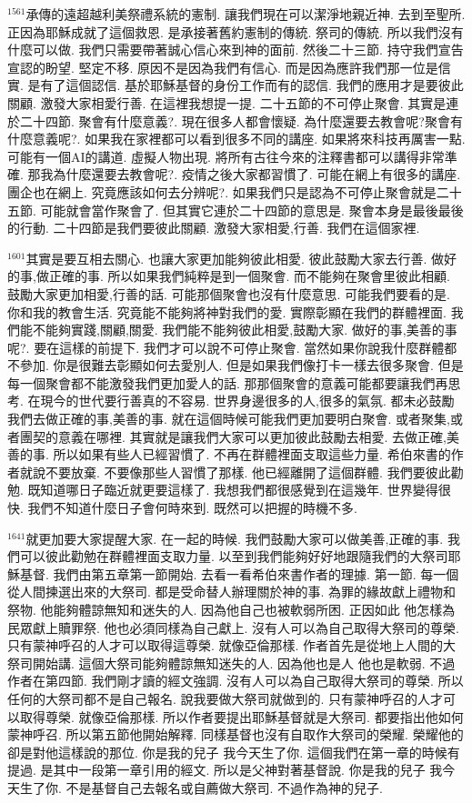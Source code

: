 \documentclass{book}
\begin{document}
$^{1561}$承傳的遠超越利美祭禮系統的憲制.
讓我們現在可以潔淨地親近神.
去到至聖所.
正因為耶穌成就了這個救恩.
是承接著舊約憲制的傳統.
祭司的傳統.
所以我們沒有什麼可以做.
我們只需要帶著誠心信心來到神的面前.
然後二十三節.
持守我們宣告宣認的盼望.
堅定不移.
原因不是因為我們有信心.
而是因為應許我們那一位是信實.
是有了這個認信.
基於耶穌基督的身份工作而有的認信.
我們的應用才是要彼此關顧.
激發大家相愛行善.
在這裡我想提一提.
二十五節的不可停止聚會.
其實是連於二十四節.
聚會有什麼意義?.
現在很多人都會懷疑.
為什麼還要去教會呢?聚會有什麼意義呢?.
如果我在家裡都可以看到很多不同的講座.
如果將來科技再厲害一點.
可能有一個AI的講道.
虛擬人物出現.
將所有古往今來的注釋書都可以講得非常準確.
那我為什麼還要去教會呢?.
疫情之後大家都習慣了.
可能在網上有很多的講座.
團企也在網上.
究竟應該如何去分辨呢?.
如果我們只是認為不可停止聚會就是二十五節.
可能就會當作聚會了.
但其實它連於二十四節的意思是.
聚會本身是最後最後的行動.
二十四節是我們要彼此關顧.
激發大家相愛,行善.
我們在這個家裡.

$^{1601}$其實是要互相去關心.
也讓大家更加能夠彼此相愛.
彼此鼓勵大家去行善.
做好的事,做正確的事.
所以如果我們純粹是到一個聚會.
而不能夠在聚會里彼此相顧.
鼓勵大家更加相愛,行善的話.
可能那個聚會也沒有什麼意思.
可能我們要看的是.
你和我的教會生活.
究竟能不能夠將神對我們的愛.
實際彰顯在我們的群體裡面.
我們能不能夠實踐,關顧,關愛.
我們能不能夠彼此相愛,鼓勵大家.
做好的事,美善的事呢?.
要在這樣的前提下.
我們才可以說不可停止聚會.
當然如果你說我什麼群體都不參加.
你是很難去彰顯如何去愛別人.
但是如果我們像打卡一樣去很多聚會.
但是每一個聚會都不能激發我們更加愛人的話.
那那個聚會的意義可能都要讓我們再思考.
在現今的世代要行善真的不容易.
世界身邊很多的人,很多的氣氛.
都未必鼓勵我們去做正確的事,美善的事.
就在這個時候可能我們更加要明白聚會.
或者聚集,或者團契的意義在哪裡.
其實就是讓我們大家可以更加彼此鼓勵去相愛.
去做正確,美善的事.
所以如果有些人已經習慣了.
不再在群體裡面支取這些力量.
希伯來書的作者就說不要放棄.
不要像那些人習慣了那樣.
他已經離開了這個群體.
我們要彼此勸勉.
既知道哪日子臨近就更要這樣了.
我想我們都很感覺到在這幾年.
世界變得很快.
我們不知道什麼日子會何時來到.
既然可以把握的時機不多.

$^{1641}$就更加要大家提醒大家.
在一起的時候.
我們鼓勵大家可以做美善,正確的事.
我們可以彼此勸勉在群體裡面支取力量.
以至到我們能夠好好地跟隨我們的大祭司耶穌基督.
我們由第五章第一節開始.
去看一看希伯來書作者的理據.
第一節.
每一個從人間揀選出來的大祭司.
都是受命替人辦理關於神的事.
為罪的緣故獻上禮物和祭物.
他能夠體諒無知和迷失的人.
因為他自己也被軟弱所困.
正因如此 他怎樣為民眾獻上贖罪祭.
他也必須同樣為自己獻上.
沒有人可以為自己取得大祭司的尊榮.
只有蒙神呼召的人才可以取得這尊榮.
就像亞倫那樣.
作者首先是從地上人間的大祭司開始講.
這個大祭司能夠體諒無知迷失的人.
因為他也是人 他也是軟弱.
不過作者在第四節.
我們剛才讀的經文強調.
沒有人可以為自己取得大祭司的尊榮.
所以任何的大祭司都不是自己報名.
說我要做大祭司就做到的.
只有蒙神呼召的人才可以取得尊榮.
就像亞倫那樣.
所以作者要提出耶穌基督就是大祭司.
都要指出他如何蒙神呼召.
所以第五節他開始解釋.
同樣基督也沒有自取作大祭司的榮耀.
榮耀他的卻是對他這樣說的那位.
你是我的兒子 我今天生了你.
這個我們在第一章的時候有提過.
是其中一段第一章引用的經文.
所以是父神對著基督說.
你是我的兒子 我今天生了你.
不是基督自己去報名或自薦做大祭司.
不過作為神的兒子.
\end{document}
